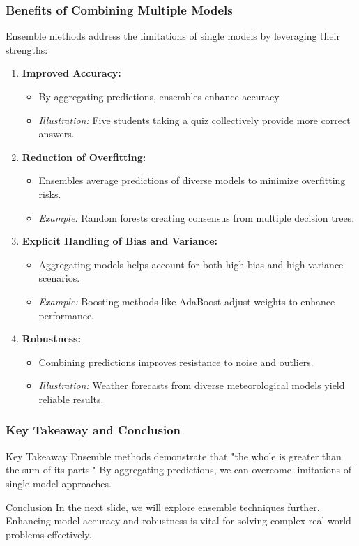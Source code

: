 \documentclass[aspectratio=169]{beamer}
\begin{document}
\begin{frame}[fragile]
    \frametitle{Benefits of Combining Multiple Models}
    Ensemble methods address the limitations of single models by leveraging their strengths:
    \begin{enumerate}
        \item \textbf{Improved Accuracy:}
        \begin{itemize}
            \item By aggregating predictions, ensembles enhance accuracy.
            \item \textit{Illustration:} Five students taking a quiz collectively provide more correct answers.
        \end{itemize}

        \item \textbf{Reduction of Overfitting:}
        \begin{itemize}
            \item Ensembles average predictions of diverse models to minimize overfitting risks.
            \item \textit{Example:} Random forests creating consensus from multiple decision trees.
        \end{itemize}

        \item \textbf{Explicit Handling of Bias and Variance:}
        \begin{itemize}
            \item Aggregating models helps account for both high-bias and high-variance scenarios.
            \item \textit{Example:} Boosting methods like AdaBoost adjust weights to enhance performance.
        \end{itemize}

        \item \textbf{Robustness:}
        \begin{itemize}
            \item Combining predictions improves resistance to noise and outliers.
            \item \textit{Illustration:} Weather forecasts from diverse meteorological models yield reliable results.
        \end{itemize}
    \end{enumerate}
\end{frame}

\begin{frame}[fragile]
    \frametitle{Key Takeaway and Conclusion}
    \begin{block}{Key Takeaway}
        Ensemble methods demonstrate that "the whole is greater than the sum of its parts."
        By aggregating predictions, we can overcome limitations of single-model approaches.
    \end{block}

    \begin{block}{Conclusion}
        In the next slide, we will explore ensemble techniques further. Enhancing model accuracy and robustness is vital for solving complex real-world problems effectively.
    \end{block}
\end{frame}
\end{document}
